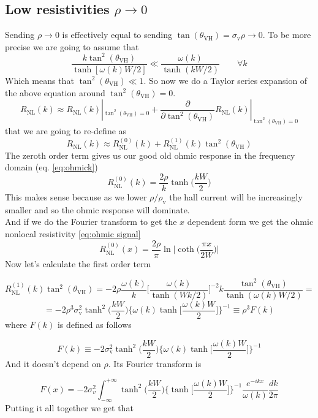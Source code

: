 \subsection{Low resistivities $\rho\to 0$}
\label{sec:lowrho}
Sending $\rho\to 0$ is effectively equal to sending $\tan(\theta_{\textrm{VH}})=\sigma_{\textrm{v}}\rho\to 0$. To be more precise we are going to assume that
\[
    \frac{k\tan^2(\theta_{\textrm{VH}})}{\tanh[\omega(k)W/2]}\ll \frac{\omega(k)}{\tanh(kW/2)}\quad\quad \forall k  
\]
Which means that $\tan^2(\theta_{\textrm{VH}})\ll 1$. So now we do a Taylor series expansion of the above equation around $\tan^2(\theta_{\textrm{VH}})= 0$.
\[
    R_{\textrm{NL}}(k)\approx R_{\textrm{NL}}(k)|_{\tan^2(\theta_{\textrm{VH}})=0} +
    \frac \partial {\partial \tan^2(\theta_{\textrm{VH}})} R_{\textrm{NL}}(k)|_{\tan^2(\theta_{\textrm{VH}})=0}
\]
that we are going to re-define as
\[
    R_{\textrm{NL}}(k)\approx R_{\textrm{NL}}^{(0)}(k) + R_{\textrm{NL}}^{(1)}(k)\tan^2(\theta_{\textrm{VH}})
\]
The zeroth order term gives us our good old ohmic response in the frequency domain (eq. \ref{eq:ohmick})
\[
    R_{\textrm{NL}}^{(0)}(k)=\frac{2\rho}k\tanh\bigg(\frac{kW}2\bigg)
\]
This makes sense because as we lower $\rho/\rho_{\textrm{v}}$ the hall current will be increasingly smaller and so the ohmic response will dominate.\\
And if we do the Fourier transform to get the $x$ dependent form we get the ohmic nonlocal resistivity \ref{eq:ohmic signal}
\begin{equation}
    R_{\textrm{NL}}^{(0)}(x)=\frac{2\rho}\pi\ln\bigg |\coth \Big(\frac{\pi x}{2W}\Big)\bigg |
\end{equation}
Now let's calculate the first order term

\[
    R_{\textrm{NL}}^{(1)}(k)\tan^2(\theta_{\textrm{VH}})=-2\rho\frac{\omega(k)}k\bigg[\frac{\omega(k)}{\tanh(Wk/2)} \bigg]^{-2}k\frac{\tan^2(\theta_{\textrm{VH}})}{\tanh(\omega(k)W/2)}=
\]
\[
    =-2\rho^3\sigma_{\textrm{v}}^2 \tanh^2\bigg(\frac{kW}2\bigg)\bigg\{\omega(k)\tanh\bigg[\frac{\omega(k) W}2\bigg]\bigg\}^{-1}\equiv
    \rho^3F(k)
\]
where $F(k)$ is defined as follows

\begin{equation}
    F(k)\equiv -2\sigma_{\textrm{v}}^2\tanh^2\bigg(\frac{kW}2\bigg)\bigg\{\omega(k)\tanh\bigg[\frac{\omega(k) W}2\bigg]\bigg\}^{-1}
\end{equation}
And it doesn't depend on $\rho$. Its Fourier transform is 

\begin{equation}
    F(x)=-2\sigma_{v}^2\int_{-\infty}^{+\infty}\tanh^2\bigg(\frac{kW}2\bigg)\bigg\{\tanh\bigg[\frac{\omega(k) W}2\bigg]\bigg\}^{-1}\frac{e^{-ikx}}{\omega(k)}\frac{dk}{2\pi}
\end{equation}
Putting it all together we get that


